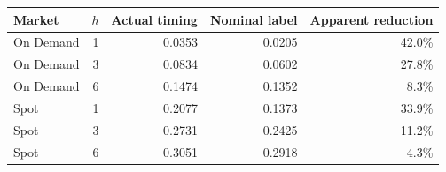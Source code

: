 \begin{tabular}{lrrrr}
\toprule
Market & $h$ & Actual timing & Nominal label & Apparent reduction \\
\midrule
On Demand & 1 & 0.0353 & 0.0205 & 42.0\% \\
On Demand & 3 & 0.0834 & 0.0602 & 27.8\% \\
On Demand & 6 & 0.1474 & 0.1352 & 8.3\% \\
Spot & 1 & 0.2077 & 0.1373 & 33.9\% \\
Spot & 3 & 0.2731 & 0.2425 & 11.2\% \\
Spot & 6 & 0.3051 & 0.2918 & 4.3\% \\
\bottomrule
\end{tabular}
